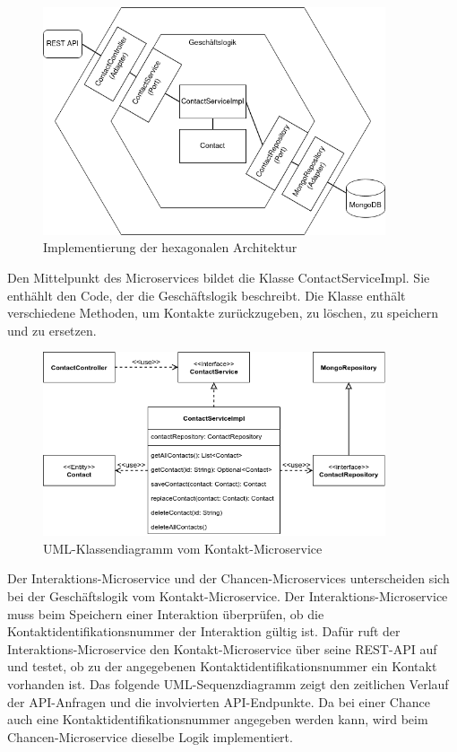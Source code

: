 \begin{figure}[H] 
    \centering
    \includegraphics[width=0.9\textwidth]{figures/HexagonalDesign.png}
    \caption{Implementierung der hexagonalen Architektur}
\end{figure}

Den Mittelpunkt des Microservices bildet die Klasse ContactServiceImpl. Sie enthählt den Code, der die Geschäftslogik beschreibt. Die Klasse enthält verschiedene Methoden, um Kontakte zurückzugeben, zu löschen, zu speichern und zu ersetzen.

\begin{figure}[H] 
    \centering
    \includegraphics[width=0.9\textwidth]{figures/UMLKlassenDiagrammKontakt.png}
    \caption{\ac{UML}-Klassendiagramm vom Kontakt-Microservice}
\end{figure}

Der Interaktions-Microservice und der Chancen-Microservices unterscheiden sich bei der Geschäftslogik vom Kontakt-Microservice. Der Interaktions-Microservice muss beim Speichern einer Interaktion überprüfen, ob die Kontaktidentifikationsnummer der Interaktion gültig ist. Dafür ruft der Interaktions-Microservice den Kontakt-Microservice über seine \ac{REST}-\ac{API} auf und testet, ob zu der angegebenen Kontaktidentifikationsnummer ein Kontakt vorhanden ist. Das folgende \ac{UML}-Sequenzdiagramm zeigt den zeitlichen Verlauf der \ac{API}-Anfragen und die involvierten \ac{API}-Endpunkte. Da bei einer Chance auch eine Kontaktidentifikationsnummer angegeben werden kann, wird beim Chancen-Microservice dieselbe Logik implementiert.

